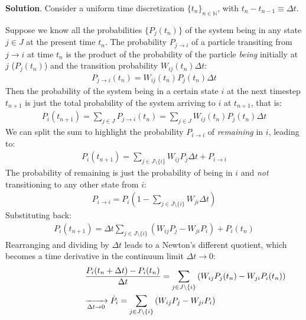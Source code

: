 \documentclass[../template.tex]{subfiles}
\begin{document}
\begin{exo}
    \textbf{Solution}. Consider a uniform time discretization $\{t_n\}_{n\in \mathbb{N}}$, with $t_n - t_{n-1} \equiv \Delta t$.
    
    Suppose we know all the probabilities $\{P_j(t_n)\}$ of the system being in any state $j \in J$ at the present time $t_n$. The probability $P_{j \to i}$ of a particle transiting from $j \to i$ at time $t_n$ is the product of the probability of the particle \textit{being} initially at $j$ ($P_j(t_n)$) and the transition probability $W_{ij}(t_n) \Delta t$:
    \begin{align*}
        P_{j \to i}(t_n) = W_{ij}(t_n)P_j(t_n) \Delta t 
    \end{align*}
    Then the probability of the system being in a certain state $i$ at the next timestep $t_{n+1}$ is just the total probability of the system arriving to $i$ at $t_{n+1}$, that is: 
    \begin{align*}
        P_i(t_{n+1}) = \sum_{j \in J} P_{j \to i}(t_n)  = \sum_{j\in J} W_{ij}(t_n)P_j(t_n) \Delta t 
    \end{align*}
    We can split the sum to highlight the probability $P_{i \to i}$ of \textit{remaining} in $i$, leading to:
    \begin{align*}
        P_{i}(t_{n+1}) = \sum_{j \in J\setminus\{i\}}W_{ij} P_j \Delta t + P_{i \to i}
    \end{align*}
    The probability of remaining is just the probability of being in $i$ and \textit{not} transitioning to any other state from $i$:
    \begin{align*}
        P_{i \to i} = P_i \left( 1- \sum_{j \in J\setminus\{i\}} W_{ji} \Delta t \right)
    \end{align*} 
    Substituting back:
    \begin{align*}
        P_{i}(t_{n+1}) = \Delta t \sum_{j \in J\setminus\{i\}} \left( W_{ij} P_j - W_{ji} P_i \right) + P_i(t_n)
    \end{align*}
    Rearranging and dividing by $\Delta t$ leads to a Newton's different quotient, which becomes a time derivative in the continuum limit $\Delta t \to 0$:
    \begin{align} \nonumber
        \frac{P_{i}(t_{n} + \Delta t)-P_i(t_n)}{\Delta t} = \sum_{j \in J\setminus\{i\}} \left(W_{ij} P_j(t_n) - W_{ji} P_i(t_n)\right) \\ \xrightarrow[\Delta t \to 0]{}  \dot{P}_i =\sum_{j \in J\setminus\{i\}} \left(W_{ij} P_j - W_{ji} P_i\right) \span   \label{eqn:dot-P}
    \end{align}

\end{exo}
\end{document}
